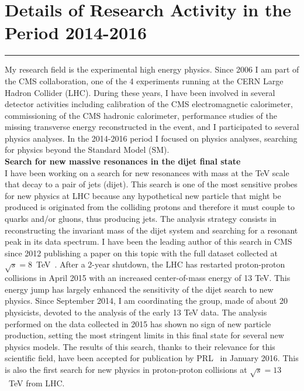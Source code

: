 \documentclass[10pt, a4paper]{article}
\begin{document}
\section*{Details of Research Activity in the Period 2014-2016}
\vspace{-5pt}
\hrule
\vspace{10pt}
My research field is the experimental high energy physics. Since 2006
I am part of the CMS collaboration, one of the 4 experiments running at
the CERN Large Hadron Collider (LHC). During these years, I have been
involved in several detector activities including calibration of the
CMS electromagnetic calorimeter, commissioning of the CMS hadronic
calorimeter, performance studies of the missing transverse energy
reconstructed in the event, and I participated to several physics analyses.
In the 2014-2016 period I focused on physics analyses, searching for 
physics beyond the Standard Model (SM). \\[1em]

{\bf Search for new massive resonances in the dijet final state}\\[0.5em]
I have been working on a search for new resonances with mass at the TeV
scale that decay to a pair of jets (dijet). This search is one of the most 
sensitive probes for new physics at LHC because any hypothetical new
particle that might be produced is originated from the
colliding protons and therefore it must couple to quarks and/or
gluons, thus producing jets. The analysis strategy consists in
reconstructing the invariant mass of the dijet system and searching for a
resonant peak in its data spectrum. I have been the leading author of this
search in CMS since 2012 publishing a paper on this topic with the
full dataset collected at $\sqrt{s}=8$~TeV~\cite{Khachatryan:2015sja}. After a 2-year
shutdown, the LHC has restarted proton-proton collisions in April 2015 with an increased 
center-of-mass energy of 13 TeV. This energy jump has largely enhanced the
sensitivity of the dijet search to new physics. Since September 2014, I
am coordinating the group, made of about 20 physicists, devoted to the
analysis of the early 13 TeV data. The analysis performed on the data
collected in 2015 has shown no sign of new particle
production, setting the most stringent limits in this final state for several new physics
models. The results of this search, thanks to their
relevance for this scientific 
field, have been accepted for publication by
PRL~\cite{Khachatryan:2015dcf} in January 2016. 
This is also the first search for new physics in proton-proton
collisions at $\sqrt{s}=13$~TeV from LHC. \\[1em]
\end{document}
